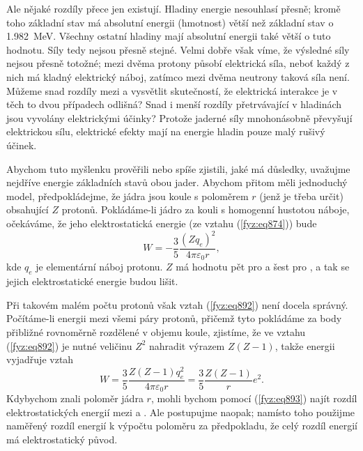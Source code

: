     Ale nějaké rozdíly přece jen existují. Hladiny energie nesouhlasí přesně; kromě toho základní
    stav  má absolutní energii (hmotnost) větší než základní stav  o
    \SI{1.982}{\mega\electronvolt}. Všechny ostatní hladiny mají absolutní energii také větší o tuto
    hodnotu. Síly tedy nejsou přesně stejné. Velmi dobře však víme, že výsledné síly nejsou přesně
    totožné; mezi dvěma protony působí elektrická síla, neboť každý z nich má kladný elektrický
    náboj, zatímco mezi dvěma neutrony taková síla není. Můžeme snad rozdíly mezi  a
     vysvětlit skutečností, že elektrická interakce je v těch to dvou případech odlišná?
    Snad i menší rozdíly přetrvávající v hladinách jsou vyvolány elektrickými účinky? Protože
    jaderné síly mnohonásobně převyšují elektrickou sílu, elektrické efekty mají na energie hladin
    pouze malý rušivý účinek.

    Abychom tuto myšlenku prověřili nebo spíše zjistili, jaké má důsledky, uvažujme nejdříve energie
    základních stavů obou jader. Abychom přitom měli jednoduchý model, předpokládejme, že jádra jsou
    koule s poloměrem \(r\) (jenž je třeba určit) obsahující \(Z\) protonů. Pokládáme-li jádro za
    kouli s homogenní hustotou náboje, očekáváme, že jeho elektrostatická energie (ze vztahu
    (\ref{fyz:eq874})) bude
    \begin{equation}\label{fyz:eq892}
      W=−\dfrac{3}{5}\dfrac{(Zq_e)^2}{4π\varepsilon_0r},
    \end{equation}
    kde \(q_e\) je elementární náboj protonu. \(Z\) má hodnotu pět pro  a šest pro
    , a tak se jejich elektrostatické energie budou lišit.
    
    Při takovém malém počtu protonů však vztah (\ref{fyz:eq892}) není docela správný. Počítáme-li
    energii mezi všemi páry protonů, přičemž tyto pokládáme za body přibližné rovnoměrně rozdělené v
    objemu koule, zjistíme, že ve vztahu (\ref{fyz:eq892}) je nutné veličinu \(Z^2\) nahradit
    výrazem \(Z(Z - 1)\), takže energii vyjadřuje vztah
    \begin{equation}\label{fyz:eq893}
      W=\dfrac{3}{5}\dfrac{Z(Z−1)q^2_e}{4π\varepsilon_0r}=\dfrac{3}{5}\dfrac{Z(Z−1)}{r}e^2.
    \end{equation}
    Kdybychom znali poloměr jádra \(r\), mohli bychom pomocí (\ref{fyz:eq893}) najít rozdíl
    elektrostatických energií mezi  a . Ale postupujme naopak; namísto toho
    použijme naměřený rozdíl energií k výpočtu poloměru za předpokladu, že celý rozdíl energií má
    elektrostatický původ.

